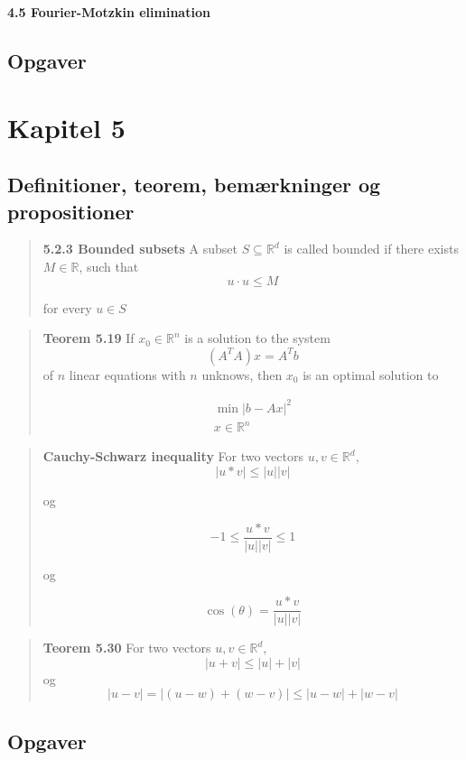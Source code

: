 \documentclass[a4paper, 12pt]{article}
\newcommand{\R}{\mathbb{R}}
\begin{document}
	\textbf{4.5 Fourier-Motzkin elimination}
	
	\subsection{Opgaver}	
	
	\section*{Kapitel 5}
	
	\subsection{Definitioner, teorem, bemærkninger og propositioner}
	\begin{quote}
		\textbf{5.2.3 Bounded subsets} A subset $ S \subseteq \R^d $
		is called bounded if there exists $ M\in \R $, such that
		\[ 		u\cdot u\leq M \]

		for every $ u\in S $
	\end{quote}
	
	
	\begin{quote}
		\textbf{Teorem 5.19} If $ x_0 \in \R^n$ is a solution to the system
		\[ (A^TA)x = A^Tb \]
		of $ n $ linear equations with $ n $ unknows, then $ x_0 $ is an optimal solution to 
		
		\[ \begin{matrix}
			\min |b - Ax|^2 \\ x \in \R^n
		\end{matrix} \]
	\end{quote}
	
	\begin{quote}
		\textbf{Cauchy-Schwarz inequality}
		For two vectors $ u,v \in \R^d $,
		\[ |u*v| \leq |u||v| \]
		
		og 
		
		\[ -1 \leq \frac{u*v}{|u||v|} \leq 1\]
		
		og 
		
		\[ \cos(\theta) =  \frac{u*v}{|u||v|}\]
		
	\end{quote}	

	\begin{quote}
		\textbf{Teorem 5.30} For two vectors $ u,v \in \R^d $,
		\[ |u + v| \leq |u| + |v| \]
		og
		\[ |u - v| = |(u - w) + (w - v)| \leq |u - w| + |w - v| \]
	\end{quote}

	
	\subsection{Opgaver}	
	
		
\end{document}
